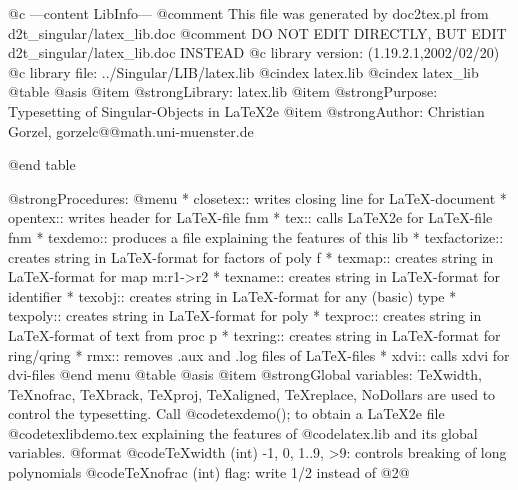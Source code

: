 @c ---content LibInfo---
@comment This file was generated by doc2tex.pl from d2t_singular/latex_lib.doc
@comment DO NOT EDIT DIRECTLY, BUT EDIT d2t_singular/latex_lib.doc INSTEAD
@c library version: (1.19.2.1,2002/02/20)
@c library file: ../Singular/LIB/latex.lib
@cindex latex.lib
@cindex latex_lib
@table @asis
@item @strong{Library:}
latex.lib
@item @strong{Purpose:}
    Typesetting of Singular-Objects in LaTeX2e
@item @strong{Author:}
Christian Gorzel, gorzelc@@math.uni-muenster.de

@end table

@strong{Procedures:}
@menu
* closetex:: writes closing line for LaTeX-document
* opentex:: writes header for LaTeX-file fnm
* tex:: calls LaTeX2e for LaTeX-file fnm
* texdemo:: produces a file explaining the features of this lib
* texfactorize:: creates string in LaTeX-format for factors of poly f
* texmap:: creates string in LaTeX-format for map m:r1->r2
* texname:: creates string in LaTeX-format for identifier
* texobj:: creates string in LaTeX-format for any (basic) type
* texpoly:: creates string in LaTeX-format for poly
* texproc:: creates string in LaTeX-format of text from proc p
* texring:: creates string in LaTeX-format for ring/qring
* rmx:: removes .aux and .log files of LaTeX-files
* xdvi:: calls xdvi for dvi-files
@end menu
@table @asis
@item @strong{Global variables:}
TeXwidth, TeXnofrac, TeXbrack, TeXproj, TeXaligned, TeXreplace, NoDollars
are used to control the typesetting.
Call @code{texdemo();} to obtain a LaTeX2e file @code{texlibdemo.tex}
explaining the features of @code{latex.lib} and its global variables.
@format
  @code{TeXwidth} (int) -1, 0, 1..9, >9:  controls breaking of long polynomials
  @code{TeXnofrac} (int) flag:  write 1/2 instead of @{2@}
